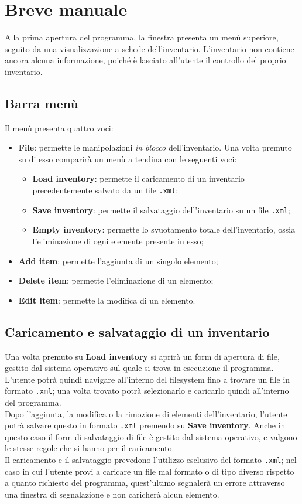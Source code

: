 \section{Breve manuale}
Alla prima apertura del programma, la finestra presenta un menù superiore, seguito da una visualizzazione a schede dell'inventario. L'inventario non contiene ancora alcuna informazione, poiché è lasciato all'utente il controllo del proprio inventario.

\subsection{Barra menù}
Il menù presenta quattro voci:
\begin{itemize}
  \item \textbf{File}: permette le manipolazioni \textit{in blocco} dell'inventario. Una volta premuto su di esso comparirà un menù a tendina con le seguenti voci:
  \begin{itemize}
    \item \textbf{Load inventory}: permette il caricamento di un inventario precedentemente salvato da un file \texttt{.xml};
    \item \textbf{Save inventory}: permette il salvataggio dell'inventario su un file \texttt{.xml};
    \item \textbf{Empty inventory}: permette lo svuotamento totale dell'inventario, ossia l'eliminazione di ogni elemente presente in esso;
  \end{itemize}
  \item \textbf{Add item}: permette l'aggiunta di un singolo elemento;
  \item \textbf{Delete item}: permette l'eliminazione di un elemento;
  \item \textbf{Edit item}: permette la modifica di un elemento.
\end{itemize}

\subsection{Caricamento e salvataggio di un inventario}
Una volta premuto su \textbf{Load inventory} si aprirà un form di apertura di file, gestito dal sistema operativo sul quale si trova in esecuzione il programma. L'utente potrà quindi navigare all'interno del filesystem fino a trovare un file in formato \texttt{.xml}; una volta trovato potrà selezionarlo e caricarlo quindi all'interno del programma. \\
Dopo l'aggiunta, la modifica o la rimozione di elementi dell'inventario, l'utente potrà salvare questo in formato \texttt{.xml} premendo su \textbf{Save inventory}. Anche in questo caso il form di salvataggio di file è gestito dal sistema operativo, e valgono le stesse regole che si hanno per il caricamento. \\
Il caricamento e il salvataggio prevedono l'utilizzo esclusivo del formato \texttt{.xml}; nel caso in cui l'utente provi a caricare un file mal formato o di tipo diverso rispetto a quanto richiesto del programma, quest'ultimo segnalerà un errore attraverso una finestra di segnalazione e non caricherà alcun elemento.

